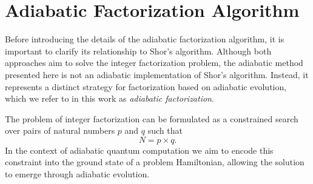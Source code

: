 \section{Adiabatic Factorization Algorithm}
\label{Section:AFA}

Before introducing the details of the adiabatic factorization algorithm, it is important to clarify its relationship to Shor’s algorithm. Although both approaches aim to solve the integer factorization problem, the adiabatic method presented here is not an adiabatic implementation of Shor’s algorithm. Instead, it represents a distinct strategy for factorization based on adiabatic evolution, which we refer to in this work as \textit{adiabatic factorization}.

The problem of integer factorization can be formulated as a constrained search over pairs of natural numbers $p$ and $q$ such that
\begin{equation}
	N = p \times q.
	\label{eq:integer_factorization}
\end{equation}
In the context of adiabatic quantum computation we aim to encode this constraint into the ground state of a problem Hamiltonian, allowing the solution to emerge through adiabatic evolution.

